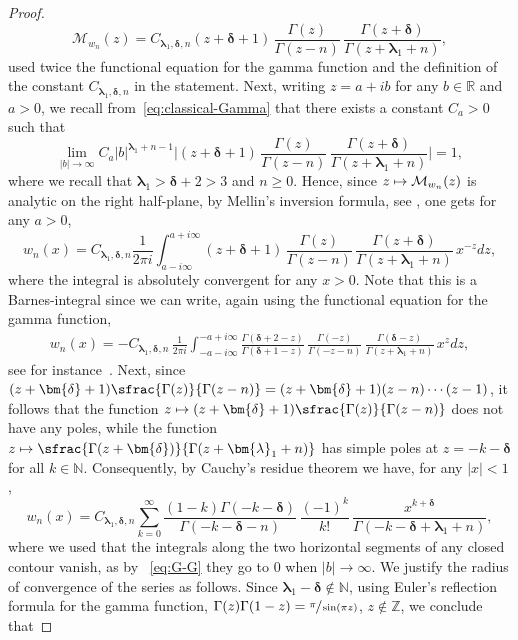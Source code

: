\documentclass[10pt]{amsart}
\newcommand\mto{\mathchoice{\longmapsto}{\mapsto}{\mapsto}{\mapsto}}
\theoremstyle{plain}
\theoremstyle{definition}
\newcommand{\N}{\mathbb{N}}
\newcommand{\R}{\mathbb{R}}
\newcommand{\lam}{{\bm{\lambda}_1}}
\newcommand{\mm}{{\bm{\delta}}}
\begin{document}
\begin{proof}
\begin{equation*}
\mathcal{M}_{w_n}(z) = C_{\lam, \mm, n} (z+\mm+1)\,\frac{\Gamma(z)}{\Gamma(z-n)}\, \frac{\Gamma(z+\mm)}{\Gamma(z+\lam+n)},
\end{equation*}
used twice the functional equation for the gamma function and the definition of the constant $C_{\lam, \mm, n}$ in the statement. Next, writing $z=a+ib$ for any $b \in \R$ and $a>0$, we recall from~\eqref{eq:classical-Gamma} that there exists a constant $C_a > 0$ such that
\begin{equation}
\label{eq:G-G}
\lim_{|b| \to \infty} C_a |b|^{\lam + n-1} \biggl|(z+\mm+1)\, \frac{\Gamma(z)}{\Gamma(z-n)}\, \frac{\Gamma(z+\mm)}{\Gamma(z+\lam+n)} \biggl| = 1,
\end{equation}
where we recall that $\lam > \mm+2 >3$ and $n \geq 0$. Hence, since $z \mto \mathcal{M}_{w_n}(z)$ is analytic on the right half-plane, by Mellin's inversion formula, see \eg \cite[Chap.\,11]{Misra-Lavoine}, one gets for any $a>0$,
\begin{equation*}
w_n(x) = C_{\lam, \mm, n} \frac{1}{2 \pi i} \int_{a - i \infty}^{a + i \infty} (z+\mm+1)\,\frac{\Gamma(z)}{\Gamma(z-n)}\, \frac{\Gamma(z+\mm)}{\Gamma(z+\lam+n)}\, x^{-z} dz,
\end{equation*}
where the integral is absolutely convergent for any $x>0$. Note that this is a Barnes-integral since we can write, again using the functional equation for the gamma function,
\begin{align*}
w_n(x) = -C_{\lam, \mm, n}\,\frac{1}{2 \pi i} \int_{-a - i \infty}^{-a + i \infty} \frac{\Gamma(\mm+2-z)}{\Gamma(\mm+1-z)}\, \frac{\Gamma(-z)}{\Gamma(-z-n)}\, \frac{\Gamma(\mm-z)}{\Gamma(z+\lam+n)}\, x^{z}dz,
\end{align*}
see for instance~\cite{barnes_integrals}. Next, since $(z+\mm+1)\sfrac{\Gamma(z)}{\Gamma(z-n)} = (z+\mm+1)(z-n)\cdots(z-1)$, it follows that the function $z \mto (z+\mm+1)\sfrac{\Gamma(z)}{\Gamma(z-n)}$ does not have any poles, while the function $z \mto \sfrac{\Gamma(z+\mm)}{\Gamma(z+\lam+n)}$ has simple poles at $z = -k-\mm$ for all $k \in \N$. Consequently, by Cauchy's residue theorem we have, for any $|x|<1$,
\begin{equation*}
w_n(x) = C_{\lam, \mm, n} \sum_{k = 0}^{\infty} \frac{(1-k)\Gamma(-k-\mm)}{\Gamma(-k-\mm-n)}\, \frac{(-1)^k}{k!}\,\frac{x^{k+\mm}}{ \Gamma(-k-\mm+\lam+n)},
\end{equation*}
where we used that the integrals along the two horizontal segments of any closed contour vanish, as by ~\eqref{eq:G-G} they go to $0$ when $|b|\to \infty$. We justify the radius of convergence of the series as follows. Since $\lam - \mm \not\in \N$, using Euler's reflection formula for the gamma function, \ie $\Gamma(z)\Gamma(1-z) = \sfrac{\pi}{\sin(\pi z)}$, $z \not\in \mathbb{Z}$, we conclude that

\end{proof}
\end{document}
